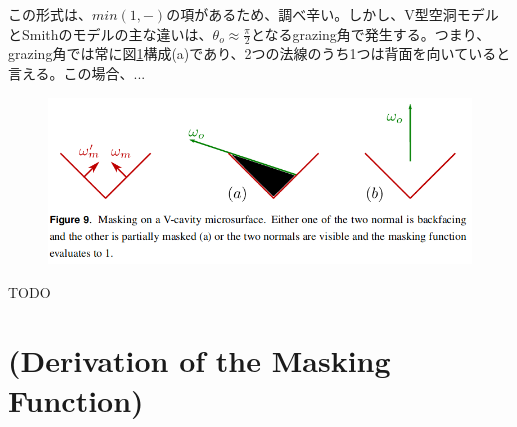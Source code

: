 \documentclass[a4j,xelatex,ja=standard]{bxjsarticle}
\begin{document}
この形式は、$min(1, -)$の項があるため、調べ辛い。しかし、V型空洞モデルとSmithのモデルの主な違いは、$\theta_o \approx \frac{\pi}{2}$となるgrazing角で発生する。つまり、grazing角では常に図\ref{fig:9}構成(a)であり、2つの法線のうち1つは背面を向いていると言える。この場合、...

\begin{figure}
    \includegraphics[width=\textwidth]{Figure9.png}
    \caption{}
    \label{fig:9}
\end{figure}

TODO

\appendix

\section{(Derivation of the Masking Function)}
\label{sec:A}
\end{document}

